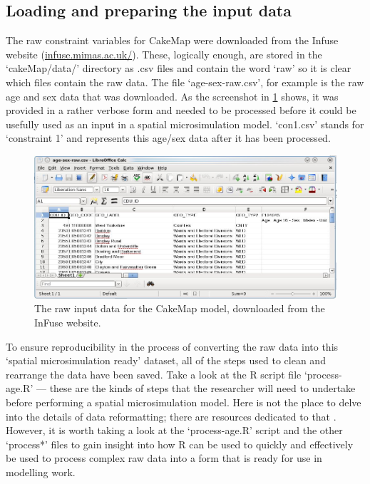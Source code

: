 \documentclass[a4paper, 11pt, twoside]{article}
\begin{document}
\subsection{Loading and preparing the input data}

The raw constraint variables for CakeMap were downloaded from
the Infuse website (\href{http://infuse.mimas.ac.uk/}{infuse.mimas.ac.uk/}).
These, logically enough, are stored in the `cakeMap/data/' directory
as .csv files and contain the word `raw' so it is clear which files
contain the raw data. The file `age-sex-raw.csv', for example is the raw
age and sex data that was downloaded. As the screenshot in \cref{fraw} shows,
it was provided in a rather verbose form and needed to be
processed before it could be usefully used as an input
in a spatial microsimulation model. `con1.csv' stands for
`constraint 1' and represents this age/sex data after it has been processed.

\begin{figure}
 \includegraphics[width=12cm]{raw-data-screenshot}
\caption{The raw input data for the CakeMap model, downloaded from the InFuse website.}
\label{fraw}
\end{figure}


To ensure reproducibility in the process of converting the raw data into
this `spatial microsimulation ready' dataset, all of the steps used to
clean and rearrange the data have been saved. Take a look at the R script file
`process-age.R' --- these are the kinds of steps that the researcher will need to
undertake before performing a spatial microsimulation model. 
Here is not the place to delve into the details of data reformatting;
there are resources dedicated to that \citep{tidy-data, kabacoff2011r}.
However, it is worth taking a look at the `process-age.R' script and the
other `process*' files to gain insight into how R can be used to quickly
and effectively be used to process complex raw data into a form that is
ready for use in modelling work.
\end{document}
